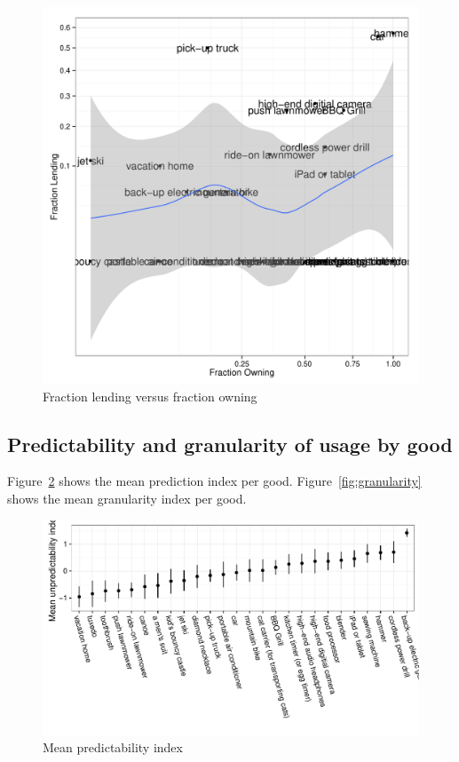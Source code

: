 \documentclass[11pt]{article}
\begin{document}
\begin{figure}
\centering 
\caption{Fraction lending versus fraction owning \label{fig:scatter_lending} }
\begin{minipage}{0.60 \linewidth}
\includegraphics[width = \linewidth]{./plots/lent_v_own.pdf} 
\end{minipage} 
\end{figure} 


\subsection{Predictability and granularity of usage by good} 

Figure~\ref{fig:predict_index} shows the mean prediction index per good. 
Figure~\ref{fig:granularity} shows the mean granularity index per good. 

\begin{figure}
\centering 
\caption{Mean predictability index \label{fig:predict_index} }
\begin{minipage}{0.90 \linewidth}
\includegraphics[width = \linewidth]{./plots/predictability.pdf} 
\end{minipage} 
\end{figure} 
\end{document}
